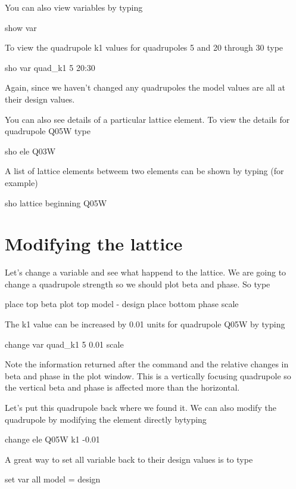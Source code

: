 \documentclass{book}
\begin{document}
You can also view variables by typing
\begin{example}
  show var
\end{example}
To view the quadrupole k1 values for \cesr quadrupoles 5  and 20 through 30 type
\begin{example}
  sho var quad\_k1 5 20:30
\end{example}
Again, since we haven't changed any quadrupoles the model values are all at their
design values.

You can also see details of a particular lattice element. To view the details
for quadrupole Q05W type
\begin{example}
  sho ele Q03W
\end{example}

A list of lattice elements betweem two elements can be shown by typing (for
example)
\begin{example}
  sho lattice beginning Q05W
\end{example}

\chapter{Modifying the lattice}
\label{c:modify_lattice}

Let's change a variable and see what happend to the lattice. We are going to
change a quadrupole strength so we should plot beta and phase. So type
\begin{example}
  place top beta
  plot top model - design
  place bottom phase
  scale
\end{example}

The k1 value can be increased by 0.01 units for quadrupole Q05W by typing
\begin{example}
  change var quad\_k1 5 0.01
  scale
\end{example}
Note the information returned after the command and the relative changes in
beta and phase in the plot window. This is a vertically focusing quadrupole so
the vertical beta and phase is affected more than the horizontal.

Let's put this quadrupole back where we found it. We can also modify the quadrupole
by modifying the element directly bytyping
\begin{example}
  change ele Q05W k1 -0.01
\end{example}

A great way to set all variable back to their design values is to type
\begin{example}
  set var all model = design
\end{example}
\end{document}
